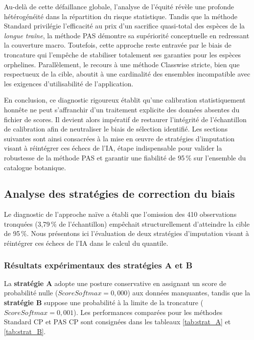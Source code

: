 \documentclass[12pt,a4paper]{article}
\begin{document}
Au-delà de cette défaillance globale, l'analyse de l'équité révèle une profonde hétérogénéité dans la répartition du risque statistique. Tandis que la méthode Standard privilégie l'efficacité au prix d'un sacrifice quasi-total des espèces de la \textit{longue traîne}, la méthode PAS démontre sa supériorité conceptuelle en redressant la couverture macro. Toutefois, cette approche reste entravée par le biais de troncature qui l'empêche de stabiliser totalement ses garanties pour les espèces orphelines. Parallèlement, le recours à une méthode Classwise stricte, bien que respectueux de la cible, aboutit à une cardinalité des ensembles incompatible avec les exigences d'utilisabilité de l'application.

En conclusion, ce diagnostic rigoureux établit qu'une calibration statistiquement honnête ne peut s'affranchir d'un traitement explicite des données absentes du fichier de scores. Il devient alors impératif de restaurer l'intégrité de l'échantillon de calibration afin de neutraliser le biais de sélection identifié. Les sections suivantes sont ainsi consacrées à la mise en œuvre de stratégies d'imputation visant à réintégrer ces échecs de l'IA, étape indispensable pour valider la robustesse de la méthode PAS et garantir une fiabilité de 95\,\% sur l'ensemble du catalogue botanique.



\subsection{Analyse des stratégies de correction du biais}

Le diagnostic de l'approche naïve a établi que l'omission des 410 observations tronquées (3,79\,\% de l'échantillon) empêchait structurellement d'atteindre la cible de 95\,\%. Nous présentons ici l'évaluation de deux stratégies d'imputation visant à réintégrer ces échecs de l'IA dans le calcul du quantile.

\subsubsection{Résultats expérimentaux des stratégies A et B}

La \textbf{stratégie A} adopte une posture conservative en assignant un score de probabilité nulle ($ScoreSoftmax=0,000$) aux données manquantes, tandis que la \textbf{stratégie B} suppose une probabilité à la limite de la troncature ($Score Softmax=0,001$). Les performances comparées pour les méthodes Standard CP et PAS CP sont consignées dans les tableaux \ref{tab:strat_A} et \ref{tab:strat_B}.
\end{document}
